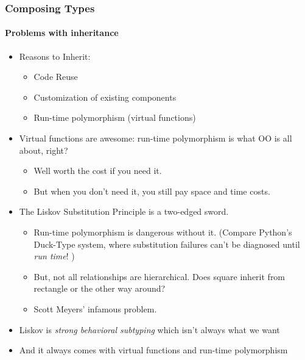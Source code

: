 \begin{frame}[fragile,t]
\frametitle{Composing Types}
\framesubtitle{Problems with inheritance}
\begin{itemize}[<+->]
\item Reasons to Inherit:
  \begin{itemize}
  \item Code Reuse
  \item Customization of existing components
  \item Run-time polymorphism (virtual functions)
\end{itemize}

\item Virtual functions are awesome: run-time polymorphism is what OO
  is all about, right?
  \begin{itemize}  
    \item Well worth the cost if you need it.
    \item But when you don't need it, you still pay space and time
      costs.
  \end{itemize}
\item The Liskov Substitution Principle is a two-edged sword.
  
  \begin{itemize}
  \item Run-time polymorphism is dangerous without it.  (Compare
      Python's Duck-Type system, where substitution failures can't be
      diagnosed until \emph{run time}! )
    \item But, not all relationships are hierarchical.  Does square
      inherit from rectangle or the other way around?
    \item Scott Meyers' infamous  problem.
\end{itemize}

\item Liskov is \emph{strong behavioral subtyping} which isn't always
  what we want
\item And it always comes with virtual functions and run-time polymorphism

\end{itemize}

\end{frame}



